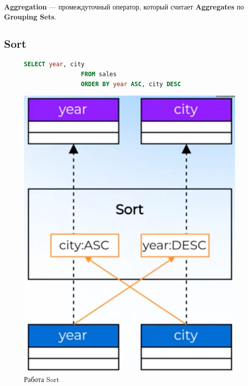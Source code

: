 \documentclass[11pt]{article}
\begin{document}
    \textbf{Aggregation} --- промеждуточный оператор, который считает \textbf{Aggregates} по \textbf{Grouping Sets}.

    \newpage

    \subsection{Sort}

    \begin{figure}[h!]
        \begin{minipage}{0.4\textwidth}
            \begin{lstlisting}[language=SQL, caption={SQL приводящий в Sort}]
                SELECT year, city
                FROM sales
                ORDER BY year ASC, city DESC
            \end{lstlisting}
        \end{minipage}
        \begin{minipage}{0.6\textwidth}
            \centering
            \includegraphics[width=\textwidth]{Pictures/Operators/Sort}
            \caption{Работа Sort}
        \end{minipage}
    \end{figure}
\end{document}
